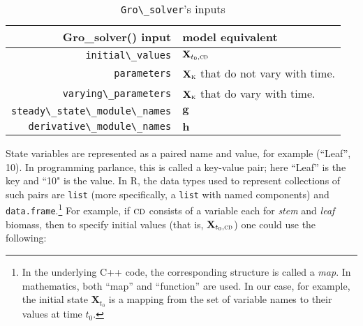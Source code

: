\documentclass{article}\usepackage[]{graphicx}\usepackage[]{color}
\newcommand{\code}[1]{\lstinline[style=C++style]{#1}}
\newcommand{\boldX}{\mathbf{X}}
\newcommand{\cd}{\textsc{cd}}
\newcommand{\kn}{\textsc{k}} %
\newcommand{\g}{\mathbf{g}}
\newcommand{\h}{\mathbf{h}}
\begin{document}
\begin{table}[!htbp]
\begin{center}
\begin{tabular}{| r | l |}
	\hline
    \textbf{Gro\_solver() input} & \textbf{model equivalent} \\
    \hline
    \code{initial\_values} & $\boldX_{t_0,\cd}$ \\
    \code{parameters} & $\boldX_\kn$ that do not vary with time. \\
    \code{varying\_parameters} & $\boldX_\kn$ that do vary with time. \\
    \code{steady\_state\_module\_names} & $\g$ \\
    \code{derivative\_module\_names} & $\h$ \\
    \hline
\end{tabular}
\caption{\code{Gro\_solver}'s inputs}
\end{center}
\end{table}

State variables are represented as a paired name and value, for
example (``Leaf'', 10). In programming parlance, this is called a
key-value pair; here ``Leaf'' is the key and ``10" is the value.  In
R, the data types used to represent collections of such pairs are
\code{list} (more specifically, a \code{list} with named components)
and \code{data.frame}.\footnote{In the underlying C++ code, the
  corresponding structure is called a \emph{map}.  In mathematics,
  both ``map'' and ``function'' are used.  In our case, for example,
  the initial state $\boldX_{t_0}$ is a mapping from the set of
  variable names to their values at time $t_0$.} For example, if $\cd$
consists of a variable each for \emph{stem} and \emph{leaf} biomass,
then to specify initial values (that is, $\boldX_{t_0,\cd}$) one could
use the following:

\lstset{
  xleftmargin=0.05\textwidth, xrightmargin=0.2\textwidth
}
\end{document}
